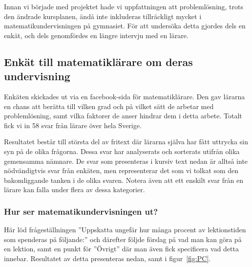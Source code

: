 \textcolor{lila}{Innan vi började med projektet hade vi uppfattningen att problemlösning, trots den ändrade kursplanen, ändå inte inkluderas tillräckligt mycket i matematikundervisningen på gymnasiet. För att undersöka detta gjordes dels en enkät, och dels genomfördes en längre intervju med en lärare.} 

\subsection{Enkät till matematiklärare om deras undervisning}
\label{sec:Bakgrundsenkat}
\textcolor{lila}{Enkäten skickades ut via en facebook-sida för matematiklärare. Den gav lärarna en chans att berätta till vilken grad och på vilket sätt de arbetar med problemlösning, samt vilka faktorer de anser hindrar dem i detta arbete. Totalt fick vi in 58 svar från lärare över hela Sverige.}

\textcolor{lila}{Resultatet består till största del av fritext där lärarna själva har fått uttrycka sin syn på de olika frågorna. Dessa svar har analyserats och sorterats utifrån olika gemensamma nämnare. De svar som presenteras i kursiv text nedan är alltså inte nödvändigtvis svar från enkäten, men representerar det som vi tolkat som den bakomliggande tanken i de olika svaren. Notera även att ett enskilt svar från en lärare kan falla under flera av dessa kategorier.}

\subsubsection{Hur ser matematikundervisningen ut?}

\textcolor{lila}{Här löd frågeställningen ''Uppskatta ungefär hur många procent av lektionstiden som spenderas på följande:'' och därefter följde förslag på vad man kan göra på en lektion, samt en punkt för ''Övrigt'' där man även fick specificera vad detta innebar. Resultatet av detta presenteras nedan, samt i figur~\ref{fig:PC}.}

